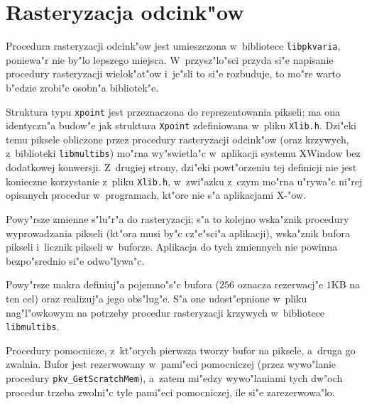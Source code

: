 \newpage
\section{Rasteryzacja odcink"ow}

Procedura rasteryzacji odcink"ow jest umieszczona w~bibliotece
\texttt{libpkvaria}, poniewa"r nie by"lo lepszego miejsca. W~przysz"lo"sci
przyda si"e napisanie procedury rasteryzacji wielok"at"ow i~je"sli to si"e
rozbuduje, to mo"re warto b"edzie zrobi"c osobn"a bibliotek"e.

\vspace{\bigskipamount}
Struktura typu \texttt{xpoint} jest przeznaczona do reprezentowania pikseli;
ma ona identyczn"a budow"e jak struktura \texttt{Xpoint} zdefiniowana
w~pliku \texttt{Xlib.h}. Dzi"eki temu piksele obliczone przez procedury
rasteryzacji odcink"ow (oraz krzywych, z~biblioteki \texttt{libmultibs})
mo"rna wy"swietla"c w~aplikacji systemu XWindow bez
dodatkowej konwersji. Z~drugiej strony, dzi"eki powt"orzeniu tej definicji
nie jest konieczne korzystanie z~pliku \texttt{Xlib.h}, w~zwi"azku z~czym
mo"rna u"rywa"c ni"rej opisanych procedur w~programach, kt"ore nie s"a
aplikacjami X-"ow.

\vspace{\bigskipamount}
Powy"rsze zmienne s"lu"r"a do rasteryzacji; s"a to kolejno wska"znik
procedury wyprowadzania pikseli (kt"ora musi by"c cz"e"sci"a aplikacji),
wska"znik bufora pikseli i~licznik pikseli w~buforze. Aplikacja do tych
zmiennych nie powinna bezpo"srednio si"e odwo"lywa"c.

\vspace{\bigskipamount}
Powy"rsze makra definiuj"a pojemno"s"c bufora ($256$ oznacza rezerwacj"e
$1$KB na ten cel) oraz realizuj"a jego obs"lug"e. S"a one udost"epnione
w~pliku nag"l"owkowym na potrzeby procedur rasteryzacji krzywych
w~bibliotece \texttt{libmultibs}.

\vspace{\bigskipamount}                              
Procedury pomocnicze, z~kt"orych pierwsza tworzy bufor na piksele, a~druga
go zwalnia. Bufor jest rezerwowany w~pami"eci pomocniczej (przez wywo"lanie
procedury \texttt{pkv\_GetScratchMem}), a~zatem mi"edzy wywo"laniami tych
dw"och procedur trzeba zwolni"c tyle pami"eci pomocniczej, ile si"e
zarezerwowa"lo.

